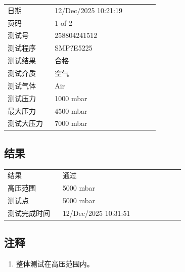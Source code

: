 \documentclass[UTF8,10pt,a4paper,fontset=fandol]{ctexart}
\newcommand{\fieldvalue}[1]{#1}
\begin{document}
\begin{tabular}{@{}p{0.28\linewidth}p{0.62\linewidth}@{}}
日期 &
\fieldvalue{12/Dec/2025 10:21:19}
\\
页码 &
\fieldvalue{1 of 2}
\\
测试号 &
\fieldvalue{258804241512}
\\
测试程序 &
\fieldvalue{SMP?E5225}
\\
测试结果 &
\fieldvalue{合格}
\\
测试介质 &
\fieldvalue{空气}
\\
测试气体 &
\fieldvalue{Air}
\\
测试压力 &
\fieldvalue{1000 mbar}
\\
最大压力 &
\fieldvalue{4500 mbar}
\\
测试大压力 &
\fieldvalue{7000 mbar}
\end{tabular}

\subsection{结果}

\begin{tabular}{@{}p{0.28\linewidth}p{0.62\linewidth}@{}}
结果 &
\fieldvalue{通过}
\\
高压范围 &
\fieldvalue{5000 mbar}
\\
测试点 &
\fieldvalue{5000 mbar}
\\
测试完成时间 &
\fieldvalue{12/Dec/2025 10:31:51}
\end{tabular}

\subsection{注释}

\begin{enumerate}
\item 整体测试在高压范围内。
\end{enumerate}
\end{document}
